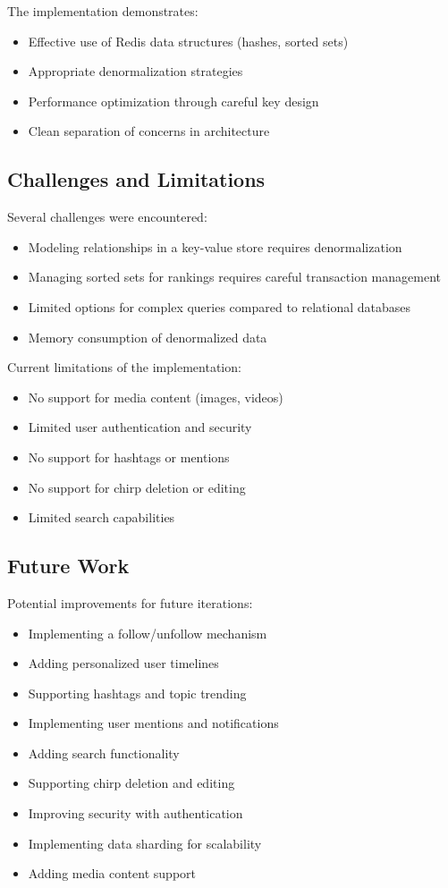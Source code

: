 \documentclass[a4paper,11pt]{article}
\begin{document}
The implementation demonstrates:

\begin{itemize}
    \item Effective use of Redis data structures (hashes, sorted sets)
    \item Appropriate denormalization strategies
    \item Performance optimization through careful key design
    \item Clean separation of concerns in architecture
\end{itemize}

\subsection{Challenges and Limitations}
Several challenges were encountered:

\begin{itemize}
    \item Modeling relationships in a key-value store requires denormalization
    \item Managing sorted sets for rankings requires careful transaction management
    \item Limited options for complex queries compared to relational databases
    \item Memory consumption of denormalized data
\end{itemize}

Current limitations of the implementation:

\begin{itemize}
    \item No support for media content (images, videos)
    \item Limited user authentication and security
    \item No support for hashtags or mentions
    \item No support for chirp deletion or editing
    \item Limited search capabilities
\end{itemize}

\subsection{Future Work}
Potential improvements for future iterations:

\begin{itemize}
    \item Implementing a follow/unfollow mechanism
    \item Adding personalized user timelines
    \item Supporting hashtags and topic trending
    \item Implementing user mentions and notifications
    \item Adding search functionality
    \item Supporting chirp deletion and editing
    \item Improving security with authentication
    \item Implementing data sharding for scalability
    \item Adding media content support
\end{itemize}
\end{document}
